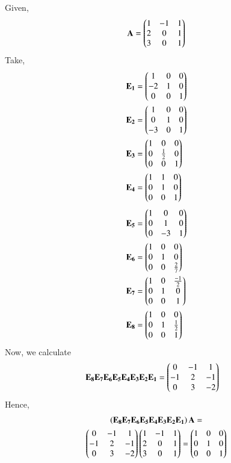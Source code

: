 Given,
\begin{align}
\mathbf{A}=\begin{pmatrix}1 & -1 & 1 \\ 2 & 0 & 1 \\ 3 & 0 & 1\end{pmatrix}	
\end{align}
Take,
\begin{align}
& \mathbf{E_1}=\begin{pmatrix}1 & 0 & 0 \\ -2 & 1 & 0 \\ 0 & 0 & 1\end{pmatrix} \\
& \mathbf{E_2} = \begin{pmatrix}1 & 0 & 0 \\0 & 1 &0 \\ -3 & 0&1\end{pmatrix} \\
& \mathbf{E_3} = \begin{pmatrix}1 & 0 & 0 \\0 & \frac{1}{2} &0 \\ 0 & 0&1\end{pmatrix} \\
& \mathbf{E_4} = \begin{pmatrix}1 & 1 & 0 \\0 & 1 &0 \\ 0 & 0&1\end{pmatrix}
\end{align}
\begin{align}
& \mathbf{E_5} = \begin{pmatrix}1 & 0 & 0 \\0 & 1 &0 \\ 0 & -3&1\end{pmatrix} \\	
& \mathbf{E_6} = \begin{pmatrix}1 & 0 & 0 \\0 & 1 &0 \\ 0 & 0& \frac{2}{7}\end{pmatrix} \\	
& \mathbf{E_7} = \begin{pmatrix}1 & 0 & \frac{-1}{2} \\0 & 1 &0 \\ 0 & 0& 1\end{pmatrix} \\	
& \mathbf{E_8} = \begin{pmatrix}1 & 0 & 0 \\0 & 1 &\frac{1}{2} \\ 0 & 0& 1\end{pmatrix}	
\end{align}
Now, we calculate
\begin{align}
& \mathbf{E_8E_7E_6E_5E_4E_3E_2E_1}= \begin{pmatrix}0 & -1 & 1 \\ -1 & 2 & -1 \\ 0 & 3 & -2\end{pmatrix} 
\end{align}
Hence,
\begin{multline}
\left(\mathbf{E_8E_7E_6E_5E_4E_3E_2E_1}\right)\mathbf{A} =\\ \begin{pmatrix}0 & -1 & 1 \\ -1 & 2 & -1 \\ 0 & 3 & -2\end{pmatrix}\begin{pmatrix}1 & -1 & 1 \\ 2 & 0 & 1 \\ 3 & 0 & 1\end{pmatrix} = 
\begin{pmatrix}1 & 0 & 0 \\ 0 & 1 & 0 \\ 0 & 0 & 1\end{pmatrix}
\end{multline}
